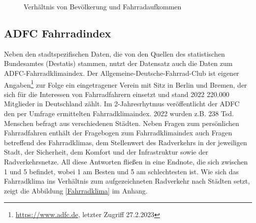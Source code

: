 \documentclass[a4paper,12pt]{thesis}
\begin{document}
\begin{figure}[!ht]%
	\centering
	\qquad
	\caption{Verhältnis von Bevölkerung und Fahrradaufkommen}%
	\label{fig:PKSundAusl}%
\end{figure}

\subsection{ADFC Fahrradindex}

Neben den stadtspezifischen Daten, die von den Quellen des statistischen Bundesamtes (Destatis) stammen, nutzt der Datensatz auch die Daten zum ADFC-Fahrradklimaindex. Der Allgemeine-Deutsche-Fahrrad-Club ist eigener Angaben\footnote{\url{https://www.adfc.de}, letzter Zugriff 27.2.2023} zur Folge ein eingetragener Verein mit Sitz in Berlin und Bremen, der sich für die Interessen von Fahrradfahrern einsetzt und stand 2022 220.000 Mitglieder in Deutschland zählt. Im 2-Jahresrhytmus veröffentlicht der ADFC den per Umfrage ermittelten Fahrradklimaindex. 2022 wurden z.B. 238 Tsd. Menschen befragt aus verschiedenen Städten. Neben Fragen zum persönlichen Fahrradfahren enthält der Fragebogen zum Fahrradklimaindex auch Fragen betreffend des Fahrradklimas, dem Stellenwert des Radverkehrs in der jeweiligen Stadt, der Sicherheit, dem Komfort und der Infrastruktur sowie der Radverkehrsnetze. All diese Antworten fließen in eine Endnote, die sich zwischen 1 und 5 befindet, wobei 1 am Besten und 5 am schlechtesten ist. Wie sich das Fahrradklima ins Verhältnis zum aufgezeichneten Radverkehr nach Städten setzt, zeigt die Abbildung \ref{Fahrradklima} im Anhang.
\end{document}
